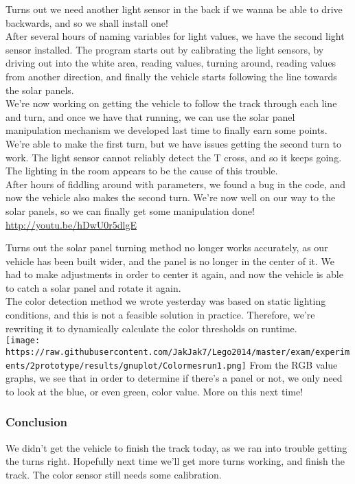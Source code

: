 Turns out we need another light sensor in the back if we wanna be able
to drive backwards, and so we shall install one!\\After several hours of
naming variables for light values, we have the second light sensor
installed. The program starts out by calibrating the light sensors, by
driving out into the white area, reading values, turning around, reading
values from another direction, and finally the vehicle starts following
the line towards the solar panels.\\We're now working on getting the
vehicle to follow the track through each line and turn, and once we have
that running, we can use the solar panel manipulation mechanism we
developed last time to finally earn some points.\\We're able to make the
first turn, but we have issues getting the second turn to work. The
light sensor cannot reliably detect the T cross, and so it keeps going.
The lighting in the room appears to be the cause of this trouble.\\After
hours of fiddling around with parameters, we found a bug in the code,
and now the vehicle also makes the second turn. We're now well on our
way to the solar panels, so we can finally get some manipulation done!
\url{http://youtu.be/hDwU0r5dlgE}

Turns out the solar panel turning method no longer works accurately, as
our vehicle has been built wider, and the panel is no longer in the
center of it. We had to make adjustments in order to center it again,
and now the vehicle is able to catch a solar panel and rotate it
again.\\The color detection method we wrote yesterday was based on
static lighting conditions, and this is not a feasible solution in
practice. Therefore, we're rewriting it to dynamically calculate the
color thresholds on
runtime.\\\texttt{[image: https://raw.githubusercontent.com/JakJak7/Lego2014/master/exam/experiments/2prototype/results/gnuplot/Colormesrun1.png]}
From the RGB value graphs, we see that in order to determine if there's
a panel or not, we only need to look at the blue, or even green, color
value. More on this next time!

\subsubsection{Conclusion}

We didn't get the vehicle to finish the track today, as we ran into
trouble getting the turns right. Hopefully next time we'll get more
turns working, and finish the track. The color sensor still needs some
calibration.
